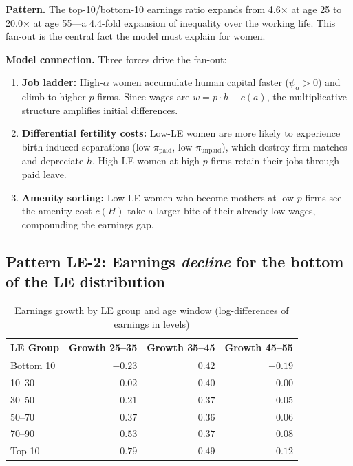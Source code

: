 \documentclass[11pt]{article}
\begin{document}
\noindent\textbf{Pattern.} The top-10/bottom-10 earnings ratio expands from 4.6$\times$ at age 25 to 20.0$\times$ at age 55---a 4.4-fold expansion of inequality over the working life. This fan-out is the central fact the model must explain for women.

\medskip\noindent\textbf{Model connection.} Three forces drive the fan-out:
\begin{enumerate}[nosep]
  \item \textbf{Job ladder:} High-$\alpha$ women accumulate human capital faster ($\psi_\alpha > 0$) and climb to higher-$p$ firms. Since wages are $w = p \cdot h - c(a)$, the multiplicative structure amplifies initial differences.
  \item \textbf{Differential fertility costs:} Low-LE women are more likely to experience birth-induced separations (low $\pi_{\text{paid}}$, low $\pi_{\text{unpaid}}$), which destroy firm matches and depreciate $h$. High-LE women at high-$p$ firms retain their jobs through paid leave.
  \item \textbf{Amenity sorting:} Low-LE women who become mothers at low-$p$ firms see the amenity cost $c(H)$ take a larger bite of their already-low wages, compounding the earnings gap.
\end{enumerate}

\subsection{Pattern LE-2: Earnings \emph{decline} for the bottom of the LE distribution}

\begin{table}[h]\centering
\caption{Earnings growth by LE group and age window (log-differences of earnings in levels)}
\begin{tabular}{lrrr}
\toprule
LE Group & Growth 25--35 & Growth 35--45 & Growth 45--55 \\
\midrule
Bottom 10 & $-0.23$ & $0.42$ & $-0.19$ \\
10--30    & $-0.02$ & $0.40$ & $0.00$ \\
30--50    & $0.21$  & $0.37$ & $0.05$ \\
50--70    & $0.37$  & $0.36$ & $0.06$ \\
70--90    & $0.53$  & $0.37$ & $0.08$ \\
Top 10    & $0.79$  & $0.49$ & $0.12$ \\
\bottomrule
\end{tabular}
\end{table}
\end{document}
